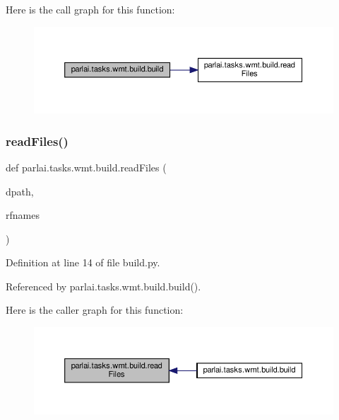 Here is the call graph for this function\+:
\nopagebreak
\begin{figure}[H]
\begin{center}
\leavevmode
\includegraphics[width=350pt]{namespaceparlai_1_1tasks_1_1wmt_1_1build_a824777527357c539f3e9d748efaa2f57_cgraph}
\end{center}
\end{figure}
\mbox{\label{namespaceparlai_1_1tasks_1_1wmt_1_1build_a192eab3c7b1241809a1c134d54a9933f}} 
\subsubsection{\texorpdfstring{read\+Files()}{readFiles()}}
{\footnotesize\ttfamily def parlai.\+tasks.\+wmt.\+build.\+read\+Files (\begin{DoxyParamCaption}\item[{}]{dpath,  }\item[{}]{rfnames }\end{DoxyParamCaption})}



Definition at line 14 of file build.\+py.



Referenced by parlai.\+tasks.\+wmt.\+build.\+build().

Here is the caller graph for this function\+:
\nopagebreak
\begin{figure}[H]
\begin{center}
\leavevmode
\includegraphics[width=350pt]{namespaceparlai_1_1tasks_1_1wmt_1_1build_a192eab3c7b1241809a1c134d54a9933f_icgraph}
\end{center}
\end{figure}
